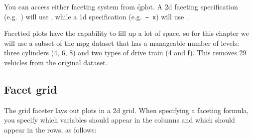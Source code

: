 You can access either faceting system from \f{qplot}. A 2d faceting specification (e.g.\ ) will use , while a 1d specification (e.g.\ \verb|~ x|) will use .

Facetted plots have the capability to fill up a lot of space, so for this chapter we will use a subset of the mpg dataset that has a manageable number of levels: three cylinders (4, 6, 8) and two types of drive train (4 and f).  This removes 29 vehicles from the original dataset.

%


\subsection{Facet grid}

The grid faceter lays out plots in a 2d grid.  When specifying a faceting formula, you specify which variables should appear in the columns and which should appear in the rows, as follows:  

